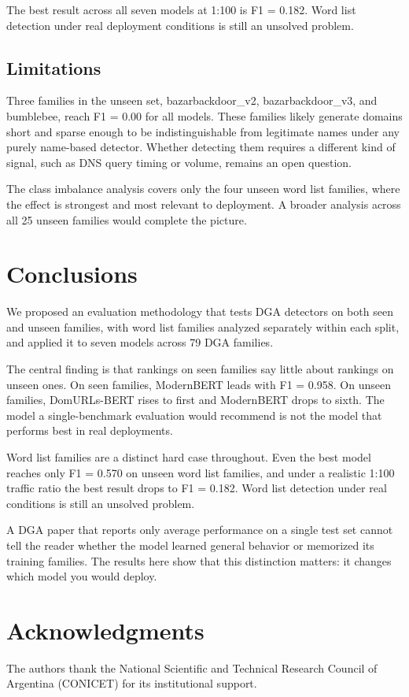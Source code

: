 \documentclass[conference]{IEEEtran}
\begin{document}
The best result across all seven models at 1:100 is F1 = 0.182. Word list detection under real deployment conditions is still an unsolved problem.

\subsection{Limitations}

Three families in the unseen set, bazarbackdoor\_v2, bazarbackdoor\_v3, and bumblebee, reach F1 = 0.00 for all models. These families likely generate domains short and sparse enough to be indistinguishable from legitimate names under any purely name-based detector. Whether detecting them requires a different kind of signal, such as DNS query timing or volume, remains an open question.

The class imbalance analysis covers only the four unseen word list families, where the effect is strongest and most relevant to deployment. A broader analysis across all 25 unseen families would complete the picture.

\section{Conclusions}
\label{sec:conclusions}

We proposed an evaluation methodology that tests DGA detectors on both seen and unseen families, with word list families analyzed separately within each split, and applied it to seven models across 79 DGA families.

The central finding is that rankings on seen families say little about rankings on unseen ones. On seen families, ModernBERT leads with F1 = 0.958. On unseen families, DomURLs-BERT rises to first and ModernBERT drops to sixth. The model a single-benchmark evaluation would recommend is not the model that performs best in real deployments.

Word list families are a distinct hard case throughout. Even the best model reaches only F1 = 0.570 on unseen word list families, and under a realistic 1:100 traffic ratio the best result drops to F1 = 0.182. Word list detection under real conditions is still an unsolved problem.

A DGA paper that reports only average performance on a single test set cannot tell the reader whether the model learned general behavior or memorized its training families. The results here show that this distinction matters: it changes which model you would deploy.

\section*{Acknowledgments}

The authors thank the National Scientific and Technical Research Council of Argentina (CONICET) for its institutional support.



\end{document}
